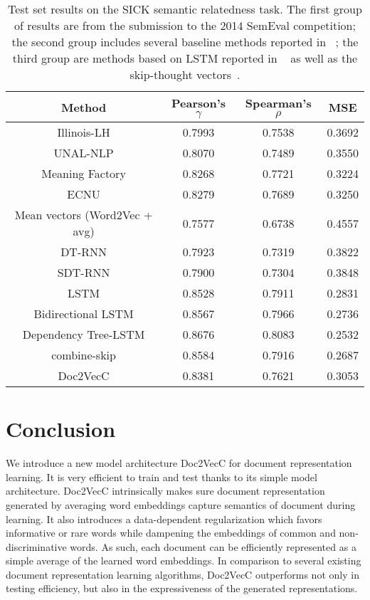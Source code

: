 \documentclass{article} \usepackage{iclr2017_conference,times}
\newcommand{\name}{Doc2VecC}
\begin{document}
\begin{table}
\caption{Test set results on the SICK semantic relatedness task.  The first group of results are from the submission to the 2014 SemEval competition; the second group includes several baseline methods reported in ~\citep{tai2015improved}; the third group are methods based on LSTM reported in ~\citep{tai2015improved} as well as the skip-thought vectors~\citep{kiros2015skip}.}
\label{tbl:sick}
\centering
\begin{tabular}{|c||c|c|c|}
\hline
Method & Pearson's $\gamma$ &  Spearman's $\rho$ & MSE\\
\hline
\hline
Illinois-LH & 0.7993 & 0.7538 & 0.3692\\
UNAL-NLP & 0.8070 & 0.7489 & 0.3550\\
Meaning Factory & 0.8268 & 0.7721&  0.3224\\
ECNU & 0.8279  & 0.7689 &  0.3250 \\
\hline
Mean vectors (Word2Vec + avg) & 0.7577 & 0.6738 & 0.4557\\
DT-RNN \citep{socher2014grounded} & 0.7923 & 0.7319 & 0.3822\\
SDT-RNN \citep{socher2014grounded}  & 0.7900 & 0.7304 & 0.3848\\
\hline
LSTM \citep{tai2015improved} & 0.8528 & 0.7911 & 0.2831\\
Bidirectional LSTM \citep{tai2015improved} & 0.8567 & 0.7966 & 0.2736\\
Dependency Tree-LSTM \citep{tai2015improved}  & 0.8676 & 0.8083 & 0.2532\\
combine-skip \citep{kiros2015skip} & 0.8584 & 0.7916 & 0.2687\\
\hline
\name & 0.8381 & 0.7621 & 0.3053\\
\hline
\end{tabular}
\end{table}



\section{Conclusion}
We introduce a new model architecture \name{} for document representation learning. It is very efficient to train and test thanks to its simple model architecture. \name{} intrinsically makes sure document representation generated by averaging word embeddings capture semantics of document during learning. It also introduces a data-dependent regularization which favors informative or rare words while dampening the embeddings of common and non-discriminative words. As such, each document can be efficiently represented as a simple average of the learned word embeddings. In comparison to several existing document representation learning algorithms, \name{} outperforms not only in testing efficiency, but also in the expressiveness of the generated representations. 




\end{document}
